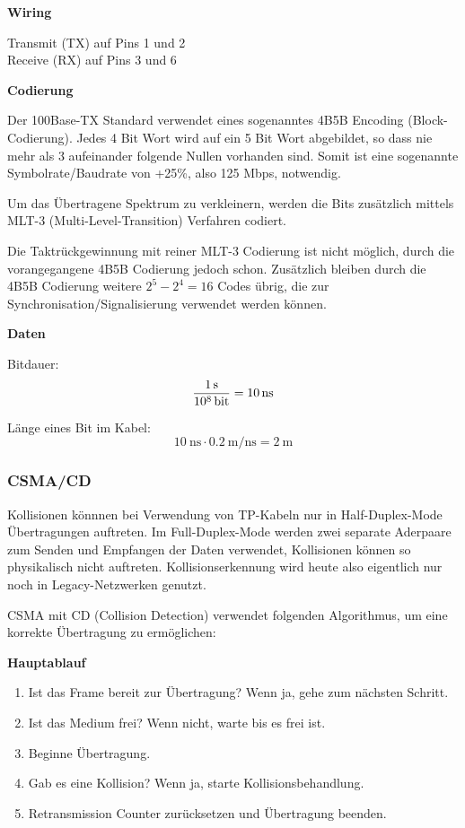 \textbf{Wiring}

Transmit (TX) auf Pins 1 und 2\\
Receive (RX) auf Pins 3 und 6

\textbf{Codierung}

Der 100Base-TX Standard verwendet eines sogenanntes 4B5B Encoding
(Block-Codierung). Jedes 4 Bit Wort wird auf ein 5 Bit Wort abgebildet, so dass
nie mehr als 3 aufeinander folgende Nullen vorhanden sind. Somit ist eine
sogenannte Symbolrate/Baudrate von +25\%, also 125 Mbps, notwendig.

Um das Übertragene Spektrum zu verkleinern, werden die Bits zusätzlich mittels
MLT-3 (Multi-Level-Transition) Verfahren codiert.

Die Taktrückgewinnung mit reiner MLT-3 Codierung ist nicht möglich, durch die
vorangegangene 4B5B Codierung jedoch schon. Zusätzlich bleiben durch die 4B5B
Codierung weitere $2^5-2^4=16$ Codes übrig, die zur
Synchronisation/Signalisierung verwendet werden können.

\textbf{Daten}

Bitdauer:
\[
	\frac{\SI{1}{\second}}{\SI{e8}{\bit}} = \SI{10}{\ns}
\]

Länge eines Bit im Kabel:
\[
	\SI{10}{\ns} \cdot \SI{0.2}{\meter\per\ns} = \SI{2}{\meter}
\]


\subsubsection{CSMA/CD}

Kollisionen könnnen bei Verwendung von TP-Kabeln nur in Half-Duplex-Mode
Übertragungen auftreten. Im Full-Duplex-Mode werden zwei separate Aderpaare zum
Senden und Empfangen der Daten verwendet, Kollisionen können so physikalisch
nicht auftreten. Kollisionserkennung wird heute also eigentlich nur noch in
Legacy-Netzwerken genutzt.

CSMA mit CD (Collision Detection) verwendet folgenden Algorithmus, um eine
korrekte Übertragung zu ermöglichen:

\textbf{Hauptablauf}

\begin{enumerate}
	\item Ist das Frame bereit zur Übertragung? Wenn ja, gehe zum nächsten
		Schritt.
	\item Ist das Medium frei? Wenn nicht, warte bis es frei ist.
	\item Beginne Übertragung.
	\item Gab es eine Kollision? Wenn ja, starte Kollisionsbehandlung.
	\item Retransmission Counter zurücksetzen und Übertragung beenden.
\end{enumerate}

